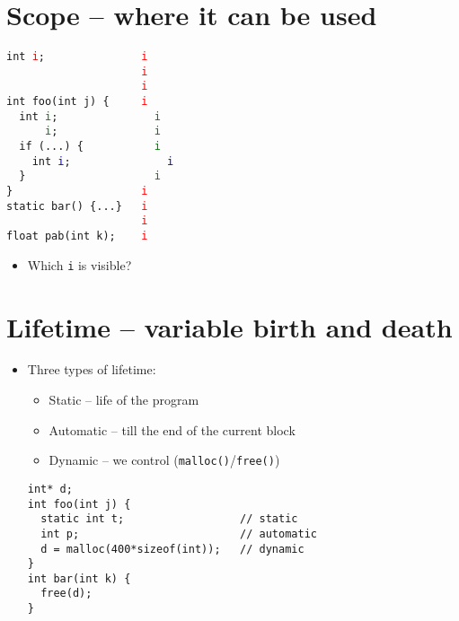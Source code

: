 \documentclass{article}
\begin{document}
\section{Scope -- where it can be used}

\verb!int !\textcolor{red}{\texttt{i}}\verb!;               !\textcolor{red}{\texttt{i}}\\
\verb!                     !\textcolor{red}{\texttt{i}}\\
\verb!                     !\textcolor{red}{\texttt{i}}\\
\verb!int foo(int j) {     !\textcolor{red}{\texttt{i}}\\
\verb!  int !\textcolor{green}{\texttt{i}}\verb!;               !\textcolor{green}{\texttt{i}}\\
\verb!      !\textcolor{green}{\texttt{i}}\verb!;               !\textcolor{green}{\texttt{i}}\\[\baselineskip]
\verb!  if (...) {           !\textcolor{green}{\texttt{i}}\\
\verb!    int !\textcolor{blue}{\texttt{i}}\verb!;               !\textcolor{blue}{\texttt{i}}\\
\verb!  }                    !\textcolor{green}{\texttt{i}}\\
\verb!}                    !\textcolor{red}{\texttt{i}}\\
\verb!static bar() {...}   !\textcolor{red}{\texttt{i}}\\
\verb!                     !\textcolor{red}{\texttt{i}}\\
\verb!float pab(int k);    !\textcolor{red}{\texttt{i}}

\begin{itemize}
\item Which \verb!i! is visible?
\end{itemize}



\section{Lifetime -- variable birth and death}
\begin{itemize}
\item Three types of lifetime:
\begin{itemize}
\item Static -- life of the program
\item Automatic -- till the end of the current block
\item Dynamic -- we control (\verb!malloc()!/\verb!free()!)
\end{itemize}

\begin{verbatim}
int* d;
int foo(int j) {
  static int t;                  // static
  int p;                         // automatic
  d = malloc(400*sizeof(int));   // dynamic
}
int bar(int k) {
  free(d);
}
\end{verbatim}
\end{itemize}
\end{document}
